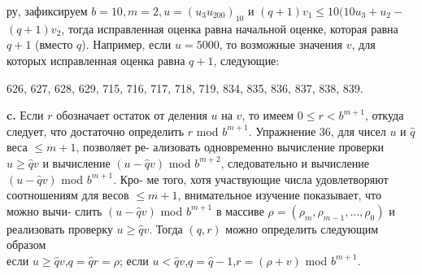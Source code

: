 ру, зафиксируем $b=10, m=2, u=(u_3u_200)_{10}$ и $(q+1)v_1\leqslant10(10u_3+u_2-$\linebreak
$(q+1)v_2$, тогда исправленная оценка равна начальной оценке, которая\linebreak
равна $q+1$ (вместо $q$). Например, если $u=5000$, то возможные значения\linebreak
$v$, для которых исправленная оценка равна $q+1$, следующие:
\begin{center}
626, 627, 628, 629, 715, 716, 717, 718, 719, 834, 835, 836, 837, 838, 839.
\end{center}
\newpage
\textbf{c.} Если $r$ обозначает остаток от деления $u$ на $v$, то имеем\linebreak
$0\leqslant{r}<b^{m+1}$, откуда следует, что достаточно определить $r$ mod\linebreak
$b^{m+1}$. Упражнение 36, для чисел $u$ и $\hat{q}$ веса $\leqslant m+1$, позволяет ре-\linebreak
ализовать одновременно вычисление проверки $u\geqslant\hat{q}v$ и вычисление\linebreak
$(u-\hat{q}v)$ mod $b^{m+2}$, следовательно и вычисление $(u-\hat{q}v)$ mod $b^{m+1}$. Кро-\linebreak
ме того, хотя участвующие числа удовлетворяют соотношениям для\linebreak
весов $\leqslant{m+1}$, внимательное изучение показывает, что можно вычи-\linebreak
слить $(u-\hat{q}v)$ mod $b^{m+1}$ в массиве $\rho=(\rho_m,\rho_{m-1},...,\rho_0)$ и реализовать\linebreak
проверку $u\geqslant\hat{q}v$. Тогда $(q,r)$ можно определить следующим образом\\

\noindent
\hspace*{40pt}если $u\geqslant\hat{q}v$,\hspace{20pt}$q=\hat{q}$\hspace{45pt}$r=\rho$;\newline
\hspace*{40pt}если $u<\hat{q}v$,\hspace{20pt}$q=\hat{q}-1$,\hspace{25pt}$r=(\rho+v)$ mod $b^{m+1}$.\\

